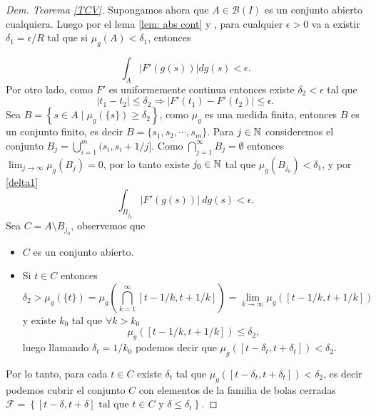 \begin{proof}[Dem. Teorema \eqref{TCV}]
Supongamos ahora que  $A\in \mathcal{B}(I)$ es un conjunto abierto cualquiera. Luego por el lema \ref{lem: abs cont} y   \cite[Teorema 3.5]{folland}, para cualquier $\epsilon>0$ va a existir $\delta_1=\epsilon/R$ tal que si $\mu_g(A)< \delta_1$, entonces


\begin{equation}
 \int_{A}|F'(g(s))|dg(s)< \epsilon. \label{delta1}
\end{equation}
Por otro lado, como $F'$ es uniformemente continua entonces existe $\delta_2<\epsilon$ tal que 
	\begin{equation}
		|t_1-t_2|\leq  \delta_2\Rightarrow |F'(t_1)-F'(t_2)|\leq \epsilon. \label{delta2}
	\end{equation}
	Sea $B=\left\lbrace s\in A \mid \mu_{g}(\{s\})\geq \delta_2\right\rbrace $, como $\mu_{g}$ es una medida finita, entonces $B$ es un conjunto finito, es decir $B=\{s_1,s_2,\cdots,s_m\}$. Para $j\in\mathbb{N}$ consideremos el conjunto $\displaystyle B_j=\bigcup_{i=1}^{m}(s_i, s_i+1/j]$. Como $\displaystyle \bigcap_{j=1}^{\infty}B_j=\emptyset$ entonces $\displaystyle \lim_{j\to\infty}\mu_{g}(B_j)=0$, por lo tanto existe $j_0\in \mathbb{N}$ tal que $\mu_{g}(B_{j_0})<\delta_1$, y por \eqref{delta1} $$\int_{B_{j_0}}|F'(g(s))|\: dg(s)< \epsilon. $$
	Sea $C=A\setminus{B_{j_0}}$, observemos que
	\begin{itemize}
		\item $C$ es un conjunto abierto.
		\item Si $t\in C$ entonces
	$$\delta_2>\mu_{g}(\{t\})=\mu_{g}\left( \bigcap_{k=1}^{\infty}[t-1/k,t+1/k] \right)=\lim\limits_{k\to\infty}\mu_{g}\left([t-1/k,t+1/k] \right) $$
y existe $k_0$ tal que $\forall k>k_0$
	$$\mu_{g}\left([t-1/k,t+1/k] \right)\leq \delta_2,$$
	luego llamando $\delta_t=1/k_0$ podemos decir que $\mu_{g}\left([t-\delta_t,t+\delta_t] \right)<\delta_2$.
		\end{itemize}  
	Por lo tanto, para cada $t\in C$ existe $\delta_t$ tal que $\mu_{g}\left([t-\delta_t,t+\delta_t] \right)<\delta_2$, es decir podemos cubrir el conjunto $C$ con elementos de la familia de bolas cerradas $\mathcal{F}=\left\lbrace [t-\delta,t+\delta] \text{ tal que } t\in C \text{ y }\delta\leq \delta_t\right\rbrace .$


\end{proof}
